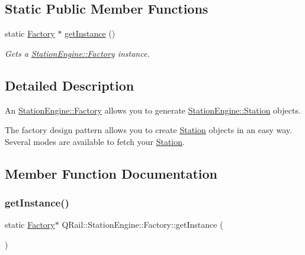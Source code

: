 \subsection*{Static Public Member Functions}
\begin{DoxyCompactItemize}
\item 
static \mbox{\hyperlink{classQRail_1_1StationEngine_1_1Factory}{Factory}} $\ast$ \mbox{\hyperlink{classQRail_1_1StationEngine_1_1Factory_ac66b314d8a7787511a6677a24ab321ff}{get\+Instance}} ()
\begin{DoxyCompactList}\small\item\em Gets a \mbox{\hyperlink{classQRail_1_1StationEngine_1_1Factory}{Station\+Engine\+::\+Factory}} instance. \end{DoxyCompactList}\end{DoxyCompactItemize}


\subsection{Detailed Description}
An \mbox{\hyperlink{classQRail_1_1StationEngine_1_1Factory}{Station\+Engine\+::\+Factory}} allows you to generate \mbox{\hyperlink{classQRail_1_1StationEngine_1_1Station}{Station\+Engine\+::\+Station}} objects. 

The factory design pattern allows you to create \mbox{\hyperlink{classQRail_1_1StationEngine_1_1Station}{Station}} objects in an easy way. Several modes are available to fetch your \mbox{\hyperlink{classQRail_1_1StationEngine_1_1Station}{Station}}. 

\subsection{Member Function Documentation}
\mbox{\label{classQRail_1_1StationEngine_1_1Factory_ac66b314d8a7787511a6677a24ab321ff}} 
\subsubsection{\texorpdfstring{getInstance()}{getInstance()}}
{\footnotesize\ttfamily static \mbox{\hyperlink{classQRail_1_1StationEngine_1_1Factory}{Factory}}$\ast$ Q\+Rail\+::\+Station\+Engine\+::\+Factory\+::get\+Instance (\begin{DoxyParamCaption}{ }\end{DoxyParamCaption})\hspace{0.3cm}{\ttfamily [static]}}



